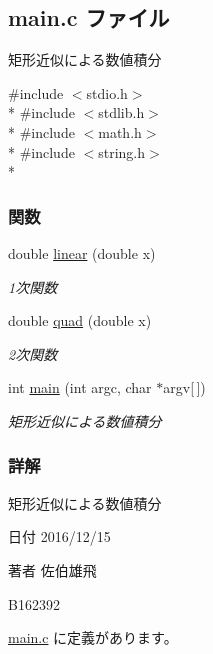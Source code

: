 \subsection{main.\-c ファイル}
\label{main_8c}


矩形近似による数値積分  


{\ttfamily \#include $<$stdio.\-h$>$}\\*
{\ttfamily \#include $<$stdlib.\-h$>$}\\*
{\ttfamily \#include $<$math.\-h$>$}\\*
{\ttfamily \#include $<$string.\-h$>$}\\*
\subsubsection*{関数}
\begin{DoxyCompactItemize}
\item 
double \hyperlink{main_8c_a64a8173e69a61debbf9544c8ee78ac43}{linear} (double x)
\begin{DoxyCompactList}\small\item\em 1次関数 \end{DoxyCompactList}\item 
double \hyperlink{main_8c_af467c08824f8a2bcd4597e65fced3ed0}{quad} (double x)
\begin{DoxyCompactList}\small\item\em 2次関数 \end{DoxyCompactList}\item 
int \hyperlink{main_8c_a0ddf1224851353fc92bfbff6f499fa97}{main} (int argc, char $\ast$argv\mbox{[}$\,$\mbox{]})
\begin{DoxyCompactList}\small\item\em 矩形近似による数値積分 \end{DoxyCompactList}\end{DoxyCompactItemize}


\subsubsection{詳解}
矩形近似による数値積分 \begin{DoxyDate}{日付}
2016/12/15 
\end{DoxyDate}
\begin{DoxyAuthor}{著者}
佐伯雄飛 

B162392 
\end{DoxyAuthor}


 \hyperlink{main_8c_source}{main.\-c} に定義があります。



